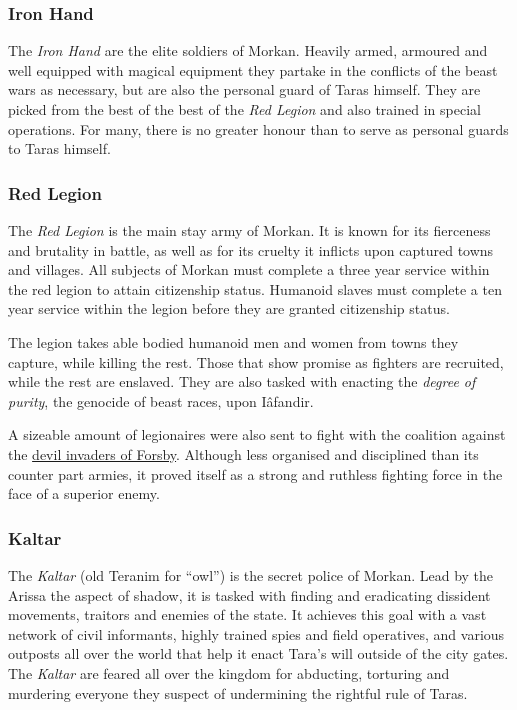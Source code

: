 \subsubsection{Iron Hand}
\label{sec:Iron Hand}

The \emph{Iron Hand} are the elite soldiers of Morkan. Heavily armed, armoured
and well equipped with magical equipment they partake in the conflicts of the
beast wars as necessary, but are also the personal guard of Taras himself. They
are picked from the best of the best of the \emph{Red Legion} and also trained
in special operations. For many, there is no greater honour than to serve as
personal guards to Taras himself.

\subsubsection{Red Legion}
\label{sec:Red Legion}

The \emph{Red Legion} is the main stay army of Morkan. It is known for its
fierceness and brutality in battle, as well as for its cruelty it inflicts
upon captured towns and villages. All subjects of Morkan must complete a
three year service within the red legion to attain citizenship status. Humanoid
slaves must complete a ten year service within the legion before they are
granted citizenship status.

The legion takes able bodied humanoid men and women from towns they
capture, while killing the rest. Those that show promise as fighters are
recruited, while the rest are enslaved. They are also tasked with enacting the
\emph{degree of purity}, the genocide of beast races, upon Iâfandir.

A sizeable amount of legionaires were also sent to fight with the coalition
against the \hyperref[sec:Devil Siege]{devil invaders of Forsby}. Although
less organised and disciplined than its counter part armies, it proved itself
as a strong and ruthless fighting force in the face of a superior enemy.

\subsubsection{Kaltar}

The \emph{Kaltar} (old Teranim for ``owl'') is the secret police of
Morkan. Lead by the Arissa the aspect of shadow, it is tasked with finding and
eradicating dissident movements, traitors and enemies of the state.  It
achieves this goal with a vast network of civil informants, highly trained
spies and field operatives, and various outposts all over the world that help
it enact Tara's will outside of the city gates. The \emph{Kaltar} are feared
all over the kingdom for abducting, torturing and murdering everyone they
suspect of undermining the rightful rule of Taras.

